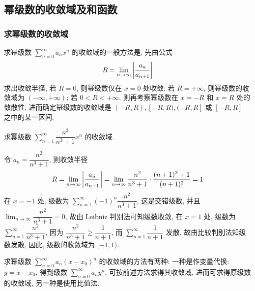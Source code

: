 \subsection{幂级数的收敛域及和函数}

\subsubsection{求幂级数的收敛域}

求幂级数 $\displaystyle\sum_{n=0}^{\infty}a_nx^n$ 的收敛域的一般方法是, 先由公式
$$R=\lim_{n\to\infty}\qty|\dfrac{a_n}{a_{n+1}}|$$
求出收敛半径, 若 $R=0$, 则幂级数仅在 $x=0$ 处收敛; 若 $R=+\infty$, 则幂级数的收敛域为 $(-\infty,+\infty)$;
若 $0<R<+\infty$, 则再考察幂级数在 $x=-R$ 和 $x=R$ 处的敛散性, 进而确定幂级数的收敛域是 $(-R,R),[-R,R),(-R,R]$ 或 $[-R,R]$ 之中的某一区间.

\begin{example}
    求幂级数 $\displaystyle\sum_{n=1}^{\infty}\dfrac{n^2}{n^3+1}x^n$ 的收敛域.
\end{example}
\begin{solution}
    令 $a_n=\dfrac{n^2}{n^3+1}$, 则收敛半径
    $$R=\displaystyle\lim_{n\to\infty}\qty|\dfrac{a_n}{a_{n+1}}|=\lim_{n\to\infty}\dfrac{n^2}{n^3+1}\cdot\dfrac{(n+1)^3+1}{(n+1)^2}=1$$
    在 $x=-1$ 处, 级数为 $\displaystyle\sum_{n=1}^{\infty}(-1)^n\dfrac{n^2}{n^3+1}$, 这是交错级数, 并且 $\displaystyle\lim_{n\to\infty}\dfrac{n^2}{n^3+1}=0$, 故由 Leibniz 判别法可知级数收敛,
    在 $x=1$ 处, 级数为 $\displaystyle\sum_{n=1}^{\infty}\dfrac{n^2}{n^3+1}$, 因为 $\dfrac{n^2}{n^3+1}\geqslant \dfrac{1}{n+1}$,
    而 $\displaystyle\sum_{n=1}^{\infty}\dfrac{1}{n+1}$ 发散, 故由比较判别法知级数发散, 因此, 级数的收敛域为 $[-1,1).$
\end{solution}

求幂级数 $\displaystyle\sum_{n=0}^{\infty}a_n(x-x_0)^n$ 的收敛域的方法有两种: 一种是作变量代换: $y=x-x_0$,
得到级数 $\displaystyle\sum_{n=0}^{\infty}a_ny^n$, 可按前述方法求得其收敛域, 进而可求得原级数的收敛域, 另一种是使用比值法.

